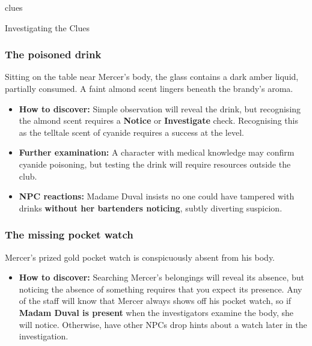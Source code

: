 {clues}

\begin{CommentBox}{Investigating the Clues}
	\subsubsection*{The poisoned drink}
	Sitting on the table near Mercer's body, the glass contains a dark amber liquid, partially consumed. A faint almond scent lingers beneath the brandy's aroma.  
	\begin{itemize}
		\item \textbf{How to discover:} Simple observation will reveal the drink, but recognising the almond scent requires a \Basic \textbf{Notice} or \textbf{Investigate} check. Recognising this as the telltale scent of cyanide requires a success at the \Difficult level.
		\item \textbf{Further examination:} A character with medical knowledge may confirm cyanide poisoning, but testing the drink will require resources outside the club.
		\item \textbf{NPC reactions:} Madame Duval insists no one could have tampered with drinks \textbf{without her bartenders noticing}, subtly diverting suspicion.
	\end{itemize}
	
	\subsubsection*{The missing pocket watch}
	Mercer’s prized gold pocket watch is conspicuously absent from his body. 
	\begin{itemize}
		\item \textbf{How to discover:} Searching Mercer’s belongings will reveal its absence, but noticing the absence of something requires that you expect its presence. Any of the staff will know that Mercer always shows off his pocket watch, so if \textbf{Madam Duval is present} when the investigators examine the body, she will notice. Otherwise, have other NPCs drop hints about a watch later in the investigation.
	\end{itemize}
	

\end{CommentBox}
